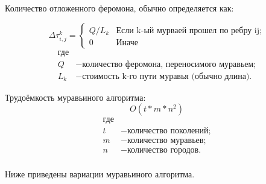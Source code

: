 \documentclass[a4paper, 14pt]{article}
\begin{document}
Количество отложенного феромона, обычно определяется как:

\begin{equation}\label{form:add} 
    {\displaystyle \Delta \tau _{i,j}^k={\begin{cases}Q/L_{k}& {\mbox{Если k-ый мурваей прошел по ребру ij;}}\\0&{\mbox{Иначе}}\end{cases}}}
\end{equation}
\begin{align*}
    \text{где} \\
    Q &- \text{количество феромона, переносимого муравьем;} \\
    L_{k} &- \text{стоимость k-го пути муравья (обычно длина).}
\end{align*}

\vspace{\baselineskip}

Трудоёмкость муравьиного алгоритма:
\begin{equation}\label{form:complex} 
O(t*m*n^2)
\end{equation}
\begin{align*}
    \text{где} \\
     t &- \text{количество поколений;} \\
     m &- \text{количество муравьев;} \\
     n &- \text{количество городов.} \\
\end{align*}

Ниже приведены вариации муравьиного алгоритма.
\end{document}
